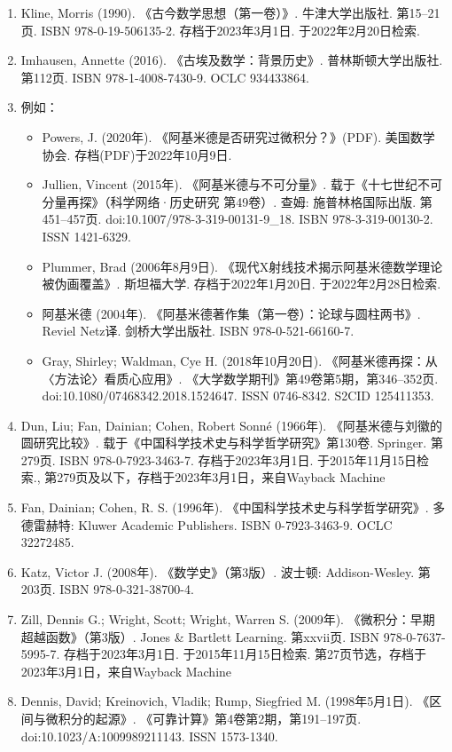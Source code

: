 \begin{enumerate}
\item Kline, Morris (1990). 《古今数学思想（第一卷）》. 牛津大学出版社. 第15–21页. ISBN 978-0-19-506135-2. 存档于2023年3月1日. 于2022年2月20日检索.  
\item Imhausen, Annette (2016). 《古埃及数学：背景历史》. 普林斯顿大学出版社. 第112页. ISBN 978-1-4008-7430-9. OCLC 934433864.  
\item 例如：  
\begin{itemize}
\item Powers, J. (2020年). 《阿基米德是否研究过微积分？》(PDF). 美国数学协会. 存档(PDF)于2022年10月9日.  
\item Jullien, Vincent (2015年). 《阿基米德与不可分量》. 载于《十七世纪不可分量再探》（科学网络·历史研究 第49卷）. 查姆: 施普林格国际出版. 第451–457页. doi:10.1007/978-3-319-00131-9_18. ISBN 978-3-319-00130-2. ISSN 1421-6329.  
\item Plummer, Brad (2006年8月9日). 《现代X射线技术揭示阿基米德数学理论被伪画覆盖》. 斯坦福大学. 存档于2022年1月20日. 于2022年2月28日检索.  
\item 阿基米德 (2004年). 《阿基米德著作集（第一卷）：论球与圆柱两书》. Reviel Netz译. 剑桥大学出版社. ISBN 978-0-521-66160-7.  
\item Gray, Shirley; Waldman, Cye H. (2018年10月20日). 《阿基米德再探：从〈方法论〉看质心应用》. 《大学数学期刊》第49卷第5期，第346–352页. doi:10.1080/07468342.2018.1524647. ISSN 0746-8342. S2CID 125411353.
\end{itemize}
\item Dun, Liu; Fan, Dainian; Cohen, Robert Sonné (1966年). 《阿基米德与刘徽的圆研究比较》. 载于《中国科学技术史与科学哲学研究》第130卷. Springer. 第279页. ISBN 978-0-7923-3463-7. 存档于2023年3月1日. 于2015年11月15日检索., 第279页及以下，存档于2023年3月1日，来自Wayback Machine  
\item Fan, Dainian; Cohen, R. S. (1996年). 《中国科学技术史与科学哲学研究》. 多德雷赫特: Kluwer Academic Publishers. ISBN 0-7923-3463-9. OCLC 32272485.  
\item Katz, Victor J. (2008年). 《数学史》（第3版）. 波士顿: Addison-Wesley. 第203页. ISBN 978-0-321-38700-4.  
\item Zill, Dennis G.; Wright, Scott; Wright, Warren S. (2009年). 《微积分：早期超越函数》（第3版）. Jones & Bartlett Learning. 第xxvii页. ISBN 978-0-7637-5995-7. 存档于2023年3月1日. 于2015年11月15日检索. 第27页节选，存档于2023年3月1日，来自Wayback Machine  
\item Dennis, David; Kreinovich, Vladik; Rump, Siegfried M. (1998年5月1日). 《区间与微积分的起源》. 《可靠计算》第4卷第2期，第191–197页. doi:10.1023/A:1009989211143. ISSN 1573-1340.  

\end{enumerate}
